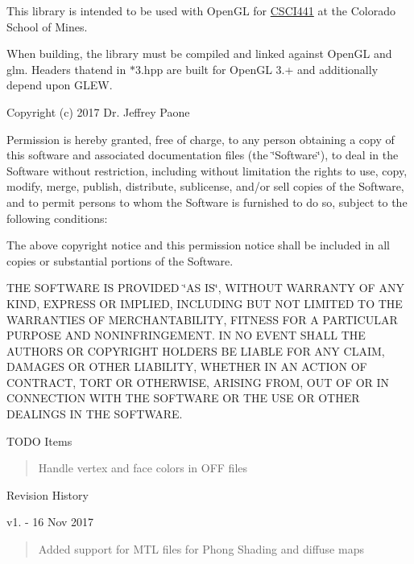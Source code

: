 This library is intended to be used with Open\+GL for \hyperlink{namespace_c_s_c_i441}{C\+S\+C\+I441} at the Colorado School of Mines.

When building, the library must be compiled and linked against Open\+GL and glm. Headers thatend in $\ast$3.hpp are built for Open\+GL 3.+ and additionally depend upon G\+L\+EW.

Copyright (c) 2017 Dr. Jeffrey Paone

Permission is hereby granted, free of charge, to any person obtaining a copy of this software and associated documentation files (the \char`\"{}\+Software\char`\"{}), to deal in the Software without restriction, including without limitation the rights to use, copy, modify, merge, publish, distribute, sublicense, and/or sell copies of the Software, and to permit persons to whom the Software is furnished to do so, subject to the following conditions\+:

The above copyright notice and this permission notice shall be included in all copies or substantial portions of the Software.

T\+HE S\+O\+F\+T\+W\+A\+RE IS P\+R\+O\+V\+I\+D\+ED \char`\"{}\+A\+S I\+S\char`\"{}, W\+I\+T\+H\+O\+UT W\+A\+R\+R\+A\+N\+TY OF A\+NY K\+I\+ND, E\+X\+P\+R\+E\+SS OR I\+M\+P\+L\+I\+ED, I\+N\+C\+L\+U\+D\+I\+NG B\+UT N\+OT L\+I\+M\+I\+T\+ED TO T\+HE W\+A\+R\+R\+A\+N\+T\+I\+ES OF M\+E\+R\+C\+H\+A\+N\+T\+A\+B\+I\+L\+I\+TY, F\+I\+T\+N\+E\+SS F\+OR A P\+A\+R\+T\+I\+C\+U\+L\+AR P\+U\+R\+P\+O\+SE A\+ND N\+O\+N\+I\+N\+F\+R\+I\+N\+G\+E\+M\+E\+NT. IN NO E\+V\+E\+NT S\+H\+A\+LL T\+HE A\+U\+T\+H\+O\+RS OR C\+O\+P\+Y\+R\+I\+G\+HT H\+O\+L\+D\+E\+RS BE L\+I\+A\+B\+LE F\+OR A\+NY C\+L\+A\+IM, D\+A\+M\+A\+G\+ES OR O\+T\+H\+ER L\+I\+A\+B\+I\+L\+I\+TY, W\+H\+E\+T\+H\+ER IN AN A\+C\+T\+I\+ON OF C\+O\+N\+T\+R\+A\+CT, T\+O\+RT OR O\+T\+H\+E\+R\+W\+I\+SE, A\+R\+I\+S\+I\+NG F\+R\+OM, O\+UT OF OR IN C\+O\+N\+N\+E\+C\+T\+I\+ON W\+I\+TH T\+HE S\+O\+F\+T\+W\+A\+RE OR T\+HE U\+SE OR O\+T\+H\+ER D\+E\+A\+L\+I\+N\+GS IN T\+HE S\+O\+F\+T\+W\+A\+RE.

T\+O\+DO Items \begin{quote}
Handle vertex and face colors in O\+FF files \end{quote}


Revision History

v1. -\/ 16 Nov 2017 \begin{quote}
Added support for M\+TL files for Phong Shading and diffuse maps \end{quote}


